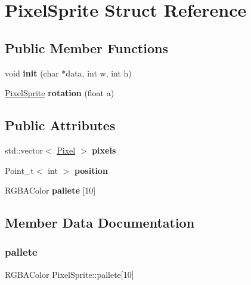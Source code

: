 \hypertarget{struct_pixel_sprite}{}\section{Pixel\+Sprite Struct Reference}
\label{struct_pixel_sprite}
\subsection*{Public Member Functions}
\begin{DoxyCompactItemize}
\item 
\mbox{\label{struct_pixel_sprite_a1a08e75f84e62a8d41d9167995e1b633}} 
void {\bfseries init} (char $\ast$data, int w, int h)
\item 
\mbox{\label{struct_pixel_sprite_a478a35c777092340f307df5a5c886025}} 
\hyperlink{struct_pixel_sprite}{Pixel\+Sprite} {\bfseries rotation} (float a)
\end{DoxyCompactItemize}
\subsection*{Public Attributes}
\begin{DoxyCompactItemize}
\item 
\mbox{\label{struct_pixel_sprite_a33f8864f6d53108c5582256a70bd545a}} 
std\+::vector$<$ \hyperlink{struct_pixel}{Pixel} $>$ {\bfseries pixels}
\item 
\mbox{\label{struct_pixel_sprite_a8b952793f8ea74335359a37c3174278c}} 
Point\+\_\+t$<$ int $>$ {\bfseries position}
\item 
R\+G\+B\+A\+Color {\bfseries pallete} \mbox{[}10\mbox{]}
\end{DoxyCompactItemize}


\subsection{Member Data Documentation}
\mbox{\label{struct_pixel_sprite_a58b79eb36d8b9caba9a4d15d178ac6bb}} 
\subsubsection{\texorpdfstring{pallete}{pallete}}
{\footnotesize\ttfamily R\+G\+B\+A\+Color Pixel\+Sprite\+::pallete\mbox{[}10\mbox{]}}

